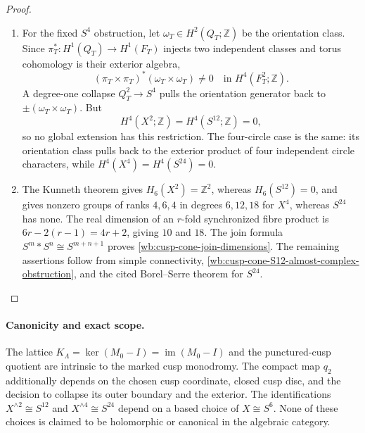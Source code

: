 \begin{proof}
\begin{enumerate}[label=\arabic*.,leftmargin=*]
\item For the fixed \(S^4\) obstruction, let
\(\omega_T\in H^2(Q_T;\mathbb Z)\) be the orientation class.  Since
\(\pi_T^*:H^1(Q_T)\to H^1(F_T)\) injects two independent classes and torus
cohomology is their exterior algebra,
\begin{equation}
 (\pi_T\times\pi_T)^*(\omega_T\times\omega_T)
 \ne0\quad\text{in }H^4(F_T^2;\mathbb Z).
 \label{wb:cusp-cone-fibre-H4-nonzero}
\end{equation}
A degree-one collapse \(Q_T^2\to S^4\) pulls the orientation generator
back to \(\pm(\omega_T\times\omega_T)\).  But
\[
 H^4(X^2;\mathbb Z)=H^4(S^{12};\mathbb Z)=0,
\]
so no global extension has this restriction.  The four-circle case is the
same: its orientation class pulls back to the exterior product of four
independent circle characters, while
\(H^4(X^4)=H^4(S^{24})=0\).

\item The Kunneth theorem gives \(H_6(X^2)=\mathbb Z^2\), whereas
\(H_6(S^{12})=0\), and gives nonzero groups of ranks \(4,6,4\) in degrees
\(6,12,18\) for \(X^4\), whereas \(S^{24}\) has none.  The real dimension
of an \(r\)-fold synchronized fibre product is
\(6r-2(r-1)=4r+2\), giving \(10\) and \(18\).  The join formula
\(S^m*S^n\cong S^{m+n+1}\) proves
\cref{wb:cusp-cone-join-dimensions}.  The remaining assertions follow from
simple connectivity, \cref{wb:cusp-cone-S12-almost-complex-obstruction}, and
the cited Borel--Serre theorem for \(S^{24}\).
\end{enumerate}
\end{proof}

\paragraph{Canonicity and exact scope.}
The lattice \(K_\Lambda=\ker(M_0-I)=\operatorname{im}(M_0-I)\) and the
punctured-cusp quotient are intrinsic to the marked cusp monodromy.
The compact map \(q_2\) additionally depends on the chosen cusp coordinate,
closed cusp disc, and the decision to collapse its outer boundary and the
exterior.  The identifications
\(X^{\wedge2}\cong S^{12}\) and \(X^{\wedge4}\cong S^{24}\) depend on a
based choice of \(X\cong S^6\).  None of these choices is claimed to be
holomorphic or canonical in the algebraic category.

